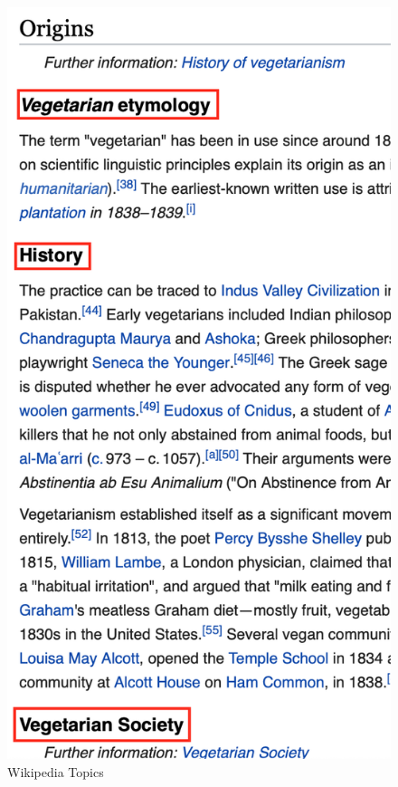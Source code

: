 \documentclass[a4paper]{article}
\begin{document}
\begin{figure}[H]
  \begin{minipage}[b]{0.4\textwidth}
    \includegraphics[width=\textwidth]{imgs/topics}
    \caption{Wikipedia Topics}
    \label{fig:topics}
  \end{minipage}
  \hfill

\end{figure}
\end{document}
